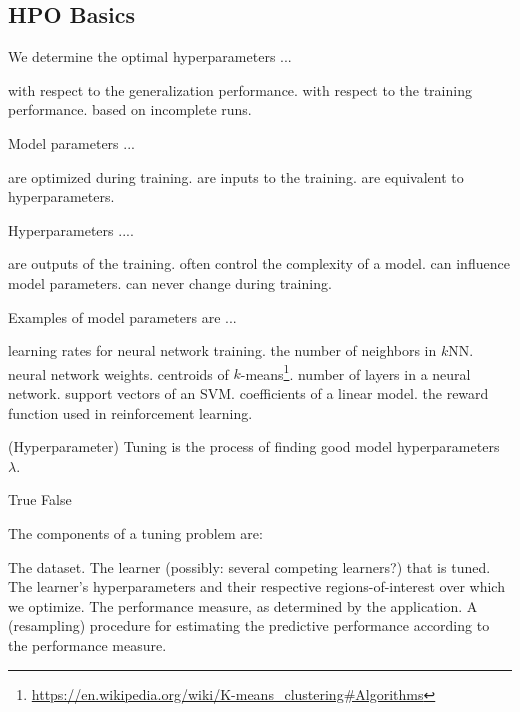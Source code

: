 \documentclass{exam}
\begin{document}
\begin{questions}
\pagebreak
\section{HPO Basics}
\question We determine the optimal hyperparameters ...
\begin{choices}
    \choice with respect to the generalization performance. %
    \choice with respect to the training performance.
    \choice based on incomplete runs.
\end{choices}

\question Model parameters ...
\begin{choices}
    \choice are optimized during training. %
    \choice are inputs to the training.
    \choice are equivalent to hyperparameters.
\end{choices}

\question Hyperparameters ....
\begin{choices}
    \choice are outputs of the training.
    \choice often control the complexity of a model. %
    \choice can influence model parameters. %
    \choice can never change during training.
\end{choices}

\question Examples of model parameters are ...
\begin{choices}
    \choice learning rates for neural network training.
    \choice the number of neighbors in $k$NN.
    \choice neural network weights. %
    \choice centroids of $k$-means\footnote{\url{https://en.wikipedia.org/wiki/K-means\_clustering\#Algorithms}}. %
    \choice number of layers in a neural network.
    \choice support vectors of an SVM. %
    \choice coefficients of a linear model. %
    \choice the reward function used in reinforcement learning.
\end{choices}

\question (Hyperparameter) Tuning is the process of finding good model hyperparameters $\lambda$.
\begin{choices}
    \choice True %
    \choice False
\end{choices}

\question The components of a tuning problem are:  %
\begin{choices}
\choice The dataset.
\choice The learner (possibly: several competing learners?) that is tuned.
\choice The learner’s hyperparameters and their respective regions-of-interest over which we optimize.
\choice The performance measure, as determined by the application.
\choice A (resampling) procedure for estimating the predictive performance according to the
performance measure.
\end{choices}


\end{questions}
\end{document}
